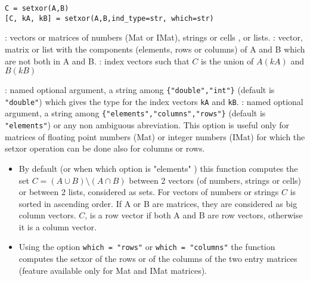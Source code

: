 
\begin{mandesc}
\end{mandesc}

\begin{calling_sequence}
\begin{verbatim}
C = setxor(A,B)
[C, kA, kB] = setxor(A,B,ind_type=str, which=str)
\end{verbatim}
\end{calling_sequence}
\begin{parameters}
  \begin{varlist}
    : vectors or matrices of numbers (Mat or IMat), strings or cells , or lists.
    : vector, matrix or list with the components (elements, rows or columns) of A and B which are
               not both in A and B.
    : index vectors such that $C$ is the union of $A(kA)$ and $B(kB)$

    : named optional argument, a string among \verb+{"double","int"}+ (default is \verb+"double"+)
    which gives the type for the index vectors  \verb+kA+ and \verb+kB+. 
    : named optional argument, a string among \verb+{"elements","columns","rows"}+ (default is
    \verb+"elements"+) or any non ambiguous abreviation. This option is useful only for matrices of floating 
       point numbers (Mat) or integer numbers (IMat) for which the setxor operation can be done also for
       columns or rows.
  \end{varlist}
\end{parameters}

\begin{mandescription}
\begin{itemize}
\item  By default (or when which option is "elements" )  this function computes the 
set $C = (A \cup B) \setminus (A \cap B)$  between 2 vectors (of numbers, strings or cells) or between 2
lists, considered as sets. For vectors of numbers or strings
$C$ is sorted in ascending order.
 If A or B are matrices, they  are considered as big 
  column vectors.
$C$, is a row vector if both A and B are row vectors, otherwise it is a column vector.
 
\item  Using the option \verb+which = "rows"+ or \verb+which = "columns"+  the function 
  computes the setxor of the rows or of the columns of the two entry 
  matrices (feature available only for Mat and IMat matrices).
\end{itemize}
 
\end{mandescription}

